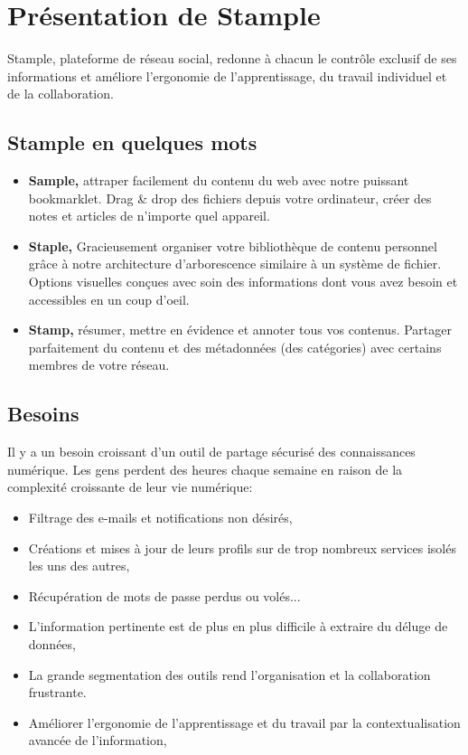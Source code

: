 \documentclass[12pt,oneside,a4paper]{article}
\begin{document}
\section{Présentation de Stample}
Stample, plateforme de réseau social, redonne à chacun le contrôle exclusif de ses informations et améliore l'ergonomie de l'apprentissage, du travail individuel et de la collaboration.
\subsection{Stample en quelques mots}
\begin{itemize}
\item \textbf{Sample,} attraper facilement du contenu du web avec notre puissant bookmarklet. Drag \& drop des fichiers depuis votre ordinateur, créer des notes et articles de n'importe quel appareil.
\item \textbf{Staple,} Gracieusement organiser votre bibliothèque de contenu personnel grâce à notre architecture d'arborescence similaire à un système de fichier.
Options visuelles conçues avec soin des informations dont vous avez besoin et accessibles en un coup d'oeil.
\item \textbf{Stamp,} résumer, mettre en évidence et annoter tous vos contenus.
Partager parfaitement du contenu et des métadonnées (des catégories) avec certains membres de votre réseau.
\end{itemize}
\subsection{Besoins}
Il y a un besoin croissant d'un outil de partage sécurisé des connaissances numérique. Les gens perdent des heures chaque semaine en raison de la complexité croissante de leur vie numérique:
\begin{itemize}
\item Filtrage des e-mails et notifications non désirés,
\item Créations et mises à jour de leurs profils sur de trop nombreux services isolés les uns des autres,
\item Récupération de mots de passe perdus ou volés...
\item L'information pertinente est de plus en plus difficile à extraire du déluge de données,
\item La grande segmentation des outils rend l'organisation et la collaboration frustrante.
\item Améliorer l'ergonomie de l'apprentissage et du travail par la contextualisation avancée de l'information,

\end{itemize}
\end{document}
